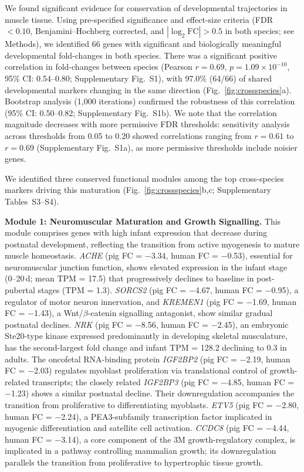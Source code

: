 \documentclass[10pt,a4paper]{article}
\newcommand{\figref}[1]{Fig.~\ref{#1}}
\begin{document}
We found significant evidence for conservation of developmental trajectories in muscle tissue. Using pre-specified significance and effect-size criteria (FDR $< 0.10$, Benjamini--Hochberg corrected, and $|\log_2\mathrm{FC}| > 0.5$ in both species; see Methods), we identified 66 genes with significant and biologically meaningful developmental fold-changes in both species. There was a significant positive correlation in fold-changes between species (Pearson $r = 0.69$, $p = 1.09 \times 10^{-10}$, 95\% CI: 0.54--0.80; Supplementary Fig.~S1), with 97.0\% (64/66) of shared developmental markers changing in the same direction (\figref{fig:crossspecies}a). Bootstrap analysis (1,000 iterations) confirmed the robustness of this correlation (95\% CI: 0.50--0.82; Supplementary Fig.~S1b). We note that the correlation magnitude decreases with more permissive FDR thresholds: sensitivity analysis across thresholds from 0.05 to 0.20 showed correlations ranging from $r = 0.61$ to $r = 0.69$ (Supplementary Fig.~S1a), as more permissive thresholds include noisier genes.

We identified three conserved functional modules among the top cross-species markers driving this maturation (\figref{fig:crossspecies}b,c; Supplementary Tables~S3--S4).

\textbf{Module 1: Neuromuscular Maturation and Growth Signalling.} This module comprises genes with high infant expression that decrease during postnatal development, reflecting the transition from active myogenesis to mature muscle homeostasis. \textit{ACHE} (pig FC = $-$3.34, human FC = $-$0.53), essential for neuromuscular junction function\cite{rotundo_expression_2003}, shows elevated expression in the infant stage (0--20\,d; mean TPM = 17.5) that progressively declines to baseline in post-pubertal stages (TPM = 1.3). \textit{SORCS2} (pig FC = $-$4.67, human FC = $-$0.95), a regulator of motor neuron innervation\cite{thomasen_sorcs2_2023}, and \textit{KREMEN1} (pig FC = $-$1.69, human FC = $-$1.43), a Wnt/$\beta$-catenin signalling antagonist\cite{osada_wnt_2006,qin_canonical_2024}, show similar gradual postnatal declines. \textit{NRK} (pig FC = $-$8.56, human FC = $-$2.45), an embryonic Ste20-type kinase expressed predominantly in developing skeletal musculature\cite{kanai-azuma_nrk_1999}, has the second-largest fold change and infant TPM = 128.2 declining to 0.3 in adults. The oncofetal RNA-binding protein \textit{IGF2BP2} (pig FC = $-$2.19, human FC = $-$2.03) regulates myoblast proliferation via translational control of growth-related transcripts\cite{li_hmga2-igf2bp2_2012}; the closely related \textit{IGF2BP3} (pig FC = $-$4.85, human FC = $-$1.23) shows a similar postnatal decline. Their downregulation accompanies the transition from proliferative to differentiating myoblasts. \textit{ETV5} (pig FC = $-$2.80, human FC = $-$2.24), a PEA3-subfamily transcription factor implicated in myogenic differentiation and satellite cell activation\cite{taylor_role_1997}. \textit{CCDC8} (pig FC = $-$4.44, human FC = $-$3.14), a core component of the 3M growth-regulatory complex, is implicated in a pathway controlling mammalian growth\cite{hanson_exome_2011}; its downregulation parallels the transition from proliferative to hypertrophic tissue growth.
\end{document}
